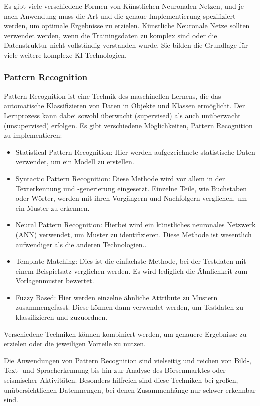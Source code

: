 Es gibt viele verschiedene Formen von Künstlichen Neuronalen Netzen, und je nach Anwendung muss die Art und die genaue Implementierung spezifiziert werden, um optimale Ergebnisse zu erzielen. Künstliche Neuronale Netze sollten verwendet werden, wenn die Trainingsdaten zu komplex sind oder die Datenstruktur nicht vollständig verstanden wurde. Sie bilden die Grundlage für viele weitere komplexe KI-Technologien.

\subsubsection{Pattern Recognition}
Pattern Recognition ist eine Technik des maschinellen Lernens, die das automatische Klassifizieren von Daten in Objekte und Klassen ermöglicht. Der Lernprozess kann dabei sowohl überwacht (supervised) als auch unüberwacht (unsupervised) erfolgen. Es gibt verschiedene Möglichkeiten, Pattern Recognition zu implementieren:\cite{kanade2023pattern}

\begin{itemize}
    \item Statistical Pattern Recognition: Hier werden aufgezeichnete statistische Daten verwendet, um ein Modell zu erstellen.
    \item Syntactic Pattern Recognition: Diese Methode wird vor allem in der Texterkennung und -generierung eingesetzt. Einzelne Teile, wie Buchstaben oder Wörter, werden mit ihren Vorgängern und Nachfolgern verglichen, um ein Muster zu erkennen.
    \item Neural Pattern Recognition: Hierbei wird ein künstliches neuronales Netzwerk (ANN) verwendet, um Muster zu identifizieren. Diese Methode ist wesentlich aufwendiger als die anderen Technologien..
    \item Template Matching: Dies ist die einfachste Methode, bei der Testdaten mit einem Beispielsatz verglichen werden. Es wird lediglich die Ähnlichkeit zum Vorlagenmuster bewertet.
    \item Fuzzy Based: Hier werden einzelne ähnliche Attribute zu Mustern zusammengefasst. Diese können dann verwendet werden, um Testdaten zu klassifizieren und zuzuordnen.
\end{itemize}

Verschiedene Techniken können kombiniert werden, um genauere Ergebnisse zu erzielen oder die jeweiligen Vorteile zu nutzen.

Die Anwendungen von Pattern Recognition sind vielseitig und reichen von Bild-, Text- und Spracherkennung bis hin zur Analyse des Börsenmarktes oder seismischer Aktivitäten. Besonders hilfreich sind diese Techniken bei großen, unübersichtlichen Datenmengen, bei denen Zusammenhänge nur schwer erkennbar sind.

